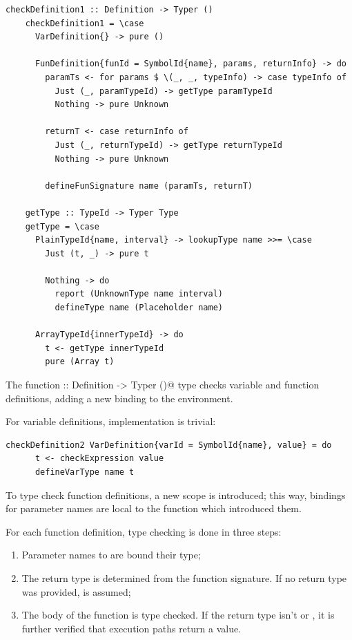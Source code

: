 \documentclass[UdineBachThesis,american,11pt]{PhdThesis}
\begin{document}
  \begin{lstlisting}[gobble=4,basicstyle=\ttfamily\small]
    checkDefinition1 :: Definition -> Typer ()
    checkDefinition1 = \case
      VarDefinition{} -> pure ()

      FunDefinition{funId = SymbolId{name}, params, returnInfo} -> do
        paramTs <- for params $ \(_, _, typeInfo) -> case typeInfo of
          Just (_, paramTypeId) -> getType paramTypeId
          Nothing -> pure Unknown

        returnT <- case returnInfo of
          Just (_, returnTypeId) -> getType returnTypeId
          Nothing -> pure Unknown

        defineFunSignature name (paramTs, returnT)

    getType :: TypeId -> Typer Type
    getType = \case
      PlainTypeId{name, interval} -> lookupType name >>= \case
        Just (t, _) -> pure t

        Nothing -> do
          report (UnknownType name interval)
          defineType name (Placeholder name)

      ArrayTypeId{innerTypeId} -> do
        t <- getType innerTypeId
        pure (Array t)
  \end{lstlisting}

  The function  :: Definition -> Typer ()@ type
  checks variable and function definitions, adding a new binding to the
  environment.

  For variable definitions, implementation is trivial:

  \begin{lstlisting}[gobble=4,basicstyle=\ttfamily\small]
    checkDefinition2 VarDefinition{varId = SymbolId{name}, value} = do
      t <- checkExpression value
      defineVarType name t
  \end{lstlisting}

  To type check function definitions, a new scope is introduced; this way,
  bindings for parameter names are local to the function which introduced them.

  For each function definition, type checking is done in three steps:

  \begin{enumerate}
    \item Parameter names to are bound their type;

    \item The return type is determined from the function signature. If no
    return type was provided, \lstinline@Unknown@ is assumed;

    \item The body of the function is type checked. If the return type isn't
    \lstinline@Unit@ or \lstinline@Unknown@, it is further verified that
    execution paths return a value.
  \end{enumerate}
\end{document}
